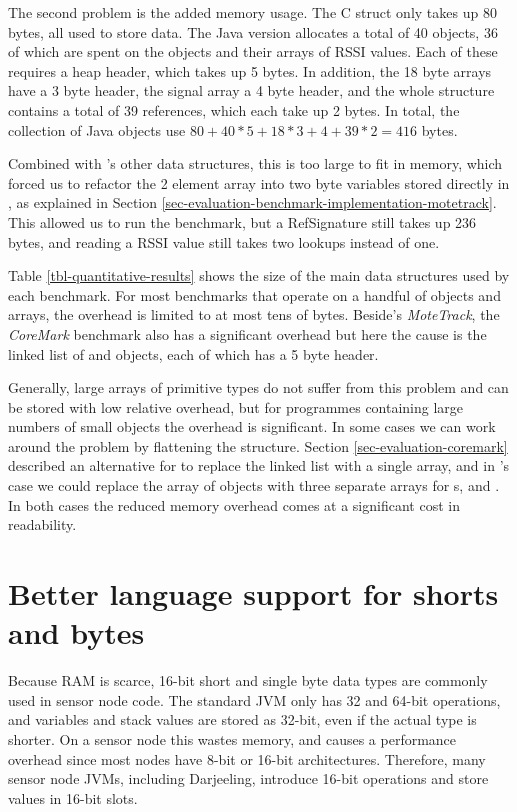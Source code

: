 The second problem is the added memory usage. The C struct only takes up 80 bytes, all used to store data. The Java version allocates a total of 40 objects, 36 of which are spent on the  objects and their arrays of RSSI values. Each of these requires a heap header, which takes up 5 bytes. In addition, the 18 byte arrays have a 3 byte header, the signal array a 4 byte header, and the whole structure contains a total of 39 references, which each take up 2 bytes. In total, the collection of Java objects use $80 + 40*5 + 18*3 + 4 + 39*2 = 416$ bytes.

Combined with 's other data structures, this is too large to fit in memory, which forced us to refactor the 2 element  array into two byte variables stored directly in , as explained in Section \ref{sec-evaluation-benchmark-implementation-motetrack}. This allowed us to run the benchmark, but a RefSignature still takes up 236 bytes, and reading a RSSI value still takes two lookups instead of one.

Table \ref{tbl-quantitative-results} shows the size of the main data structures used by each benchmark. For most benchmarks that operate on a handful of objects and arrays, the overhead is limited to at most tens of bytes. Beside's \emph{MoteTrack}, the \emph{CoreMark} benchmark also has a significant overhead but here the cause is the linked list of  and  objects, each of which has a 5 byte header.

Generally, large arrays of primitive types do not suffer from this problem and can be stored with low relative overhead, but for programmes containing large numbers of small objects the overhead is significant. In some cases we can work around the problem by flattening the structure. Section \ref{sec-evaluation-coremark} described an alternative for  to replace the linked list with a single array, and in 's case we could replace the array of  objects with three separate arrays for s,  and . In both cases the reduced memory overhead comes at a significant cost in readability.




\section{Better language support for shorts and bytes}
\label{sec-small-datatypes}
Because RAM is scarce, 16-bit short and single byte data types are commonly used in sensor node code. The standard JVM only has 32 and 64-bit operations, and variables and stack values are stored as 32-bit, even if the actual type is shorter. On a sensor node this wastes memory, and causes a performance overhead since most nodes have 8-bit or 16-bit architectures. Therefore, many sensor node JVMs, including Darjeeling, introduce 16-bit operations and store values in 16-bit slots.

